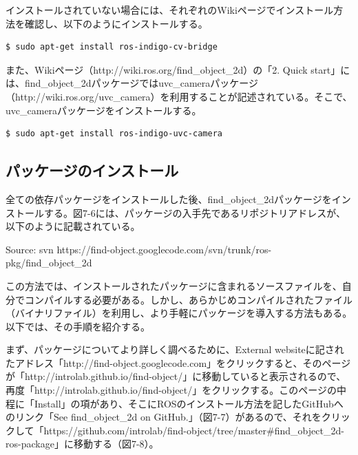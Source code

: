 インストールされていない場合には、それぞれのWikiページでインストール方法を確認し、以下のようにインストールする。

\begin{lstlisting}[language=ROS]
$ sudo apt-get install ros-indigo-cv-bridge
\end{lstlisting}

また、Wikiページ（http://wiki.ros.org/find\_object\_2d）の「2. Quick start」には、find\_object\_2dパッケージではuvc\_cameraパッケージ（http://wiki.ros.org/uvc\_camera）を利用することが記述されている。そこで、uvc\_cameraパッケージをインストールする。

\begin{lstlisting}[language=ROS]
$ sudo apt-get install ros-indigo-uvc-camera
\end{lstlisting}

\subsection{パッケージのインストール}

全ての依存パッケージをインストールした後、find\_object\_2dパッケージをインストールする。図7-6には、パッケージの入手先であるリポジトリアドレスが、以下のように記載されている。

Source: svn https://find-object.googlecode.com/svn/trunk/ros-pkg/find\_object\_2d

この方法では、インストールされたパッケージに含まれるソースファイルを、自分でコンパイルする必要がある。しかし、あらかじめコンパイルされたファイル（バイナリファイル）を利用し、より手軽にパッケージを導入する方法もある。以下では、その手順を紹介する。

まず、パッケージについてより詳しく調べるために、External websiteに記されたアドレス「http://find-object.googlecode.com」をクリックすると、そのページが「http://introlab.github.io/find-object/」に移動していると表示されるので、再度「http://introlab.github.io/find-object/」をクリックする。このページの中程に「Install」の項があり、そこにROSのインストール方法を記したGitHubへのリンク「See find\_object\_2d on GitHub.」（図7-7）があるので、それをクリックして「https://github.com/introlab/find-object/tree/master#find\_object\_2d-ros-package」に移動する（図7-8）。

